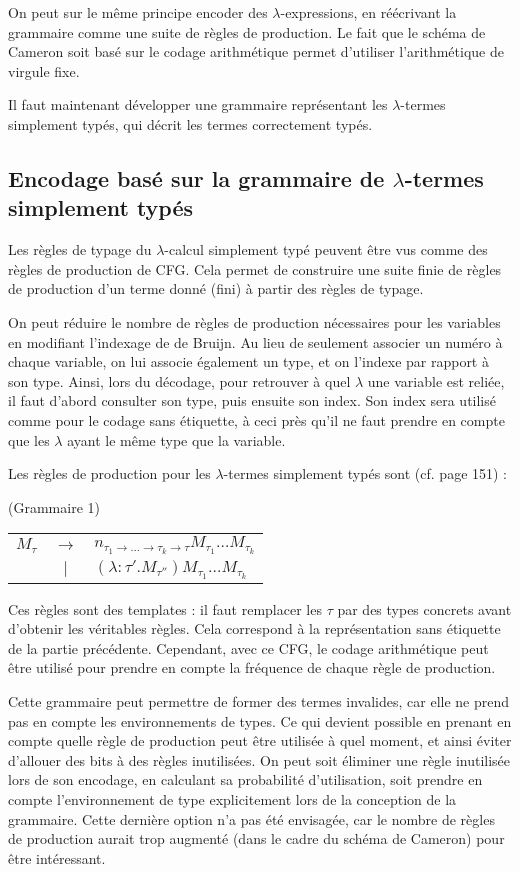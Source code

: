 \documentclass[titlepage]{article}
\begin{document}
On peut sur le même principe encoder des $\lambda$-expressions, en réécrivant la grammaire comme une suite de règles de production. Le fait que le schéma de Cameron soit basé sur le codage arithmétique permet d'utiliser l'arithmétique de virgule fixe.

Il faut maintenant développer une grammaire représentant les $\lambda$-termes simplement typés, qui décrit les termes correctement typés.

\subsection{Encodage basé sur la grammaire de $\lambda$-termes simplement typés}
Les règles de typage du $\lambda$-calcul simplement typé peuvent être vus comme des règles de production de CFG. Cela permet de construire une suite finie de règles de production d'un terme donné (fini) à partir des règles de typage.

On peut réduire le nombre de règles de production nécessaires pour les variables en modifiant l'indexage de de Bruijn. Au lieu de seulement associer un numéro à chaque variable, on lui associe également un type, et on l'indexe par rapport à son type. Ainsi, lors du décodage, pour retrouver à quel $\lambda$ une variable est reliée, il faut d'abord consulter son type, puis ensuite son index. Son index sera utilisé comme pour le codage sans étiquette, à ceci près qu'il ne faut prendre en compte que les $\lambda$ ayant le même type que la variable.

Les règles de production pour les $\lambda$-termes simplement typés sont (cf. page 151) :
\begin{center}
  (Grammaire 1)
   \begin{tabular}{ c c l }
     $M_\tau$ & $\to$ & $n_{\tau_1 \to \dots \to \tau_k \to \tau}M_{\tau_1}\dots M_{\tau_k}$ \\
     & $\vert$ & $(\lambda : \tau' .M_{\tau''})M_{\tau_1}\dots M_{\tau_k}$ \\
   \end{tabular}
 \end{center}
Ces règles sont des templates : il faut remplacer les $\tau$ par des types concrets avant d'obtenir les véritables règles. Cela correspond à la représentation sans étiquette de la partie précédente. Cependant, avec ce CFG, le codage arithmétique peut être utilisé pour prendre en compte la fréquence de chaque règle de production.

Cette grammaire peut permettre de former des termes invalides, car elle ne prend pas en compte les environnements de types. Ce qui devient possible en prenant en compte quelle règle de production peut être utilisée à quel moment, et ainsi éviter d'allouer des bits à des règles inutilisées. On peut soit éliminer une règle inutilisée lors de son encodage, en calculant sa probabilité d'utilisation, soit prendre en compte l'environnement de type explicitement lors de la conception de la grammaire. Cette dernière option n'a pas été envisagée, car le nombre de règles de production aurait trop augmenté (dans le cadre du schéma de Cameron) pour être intéressant.
\end{document}
